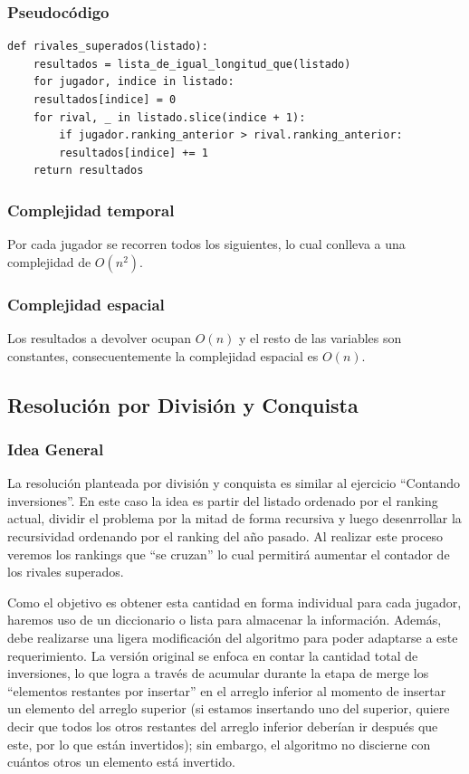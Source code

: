 \documentclass[titlepage,a4paper]{article}
\begin{document}
\subsubsection{Pseudocódigo}
\label{sec:org0f6ec6a}

\begin{verbatim}
def rivales_superados(listado):
    resultados = lista_de_igual_longitud_que(listado)
    for jugador, indice in listado:
	resultados[indice] = 0
	for rival, _ in listado.slice(indice + 1):
	    if jugador.ranking_anterior > rival.ranking_anterior:
		resultados[indice] += 1
    return resultados
\end{verbatim}

\subsubsection{Complejidad temporal}
\label{sec:orgb18061b}

Por cada jugador se recorren todos los siguientes, lo cual conlleva a una complejidad de \(O(n^2)\).

\subsubsection{Complejidad espacial}
\label{sec:orgc05b70b}

Los resultados a devolver ocupan \(O(n)\) y el resto de las variables son constantes, consecuentemente la complejidad espacial es \(O(n)\).

\subsection{Resolución por División y Conquista}
\label{sec:org1b42cec}

\subsubsection{Idea General}
\label{sec:orgdc30f1c}

La resolución planteada por división y conquista es similar al ejercicio “Contando inversiones”. En este caso la idea es partir del listado ordenado por el ranking actual, dividir el problema por la mitad de forma recursiva y luego desenrrollar la recursividad ordenando por el ranking del año pasado. Al realizar este proceso veremos los rankings que “se cruzan” lo cual permitirá aumentar el contador de los rivales superados.

Como el objetivo es obtener esta cantidad en forma individual para cada jugador, haremos uso de un diccionario o lista para almacenar la información. Además, debe realizarse una ligera modificación del algoritmo para poder adaptarse a este requerimiento. La versión original se enfoca en contar la cantidad total de inversiones, lo que logra a través de acumular durante la etapa de merge los “elementos restantes por insertar” en el arreglo inferior al momento de insertar un elemento del arreglo superior (si estamos insertando uno del superior, quiere decir que todos los otros restantes del arreglo inferior deberían ir después que este, por lo que están invertidos); sin embargo, el algoritmo no discierne con cuántos otros un elemento está invertido.
\end{document}
